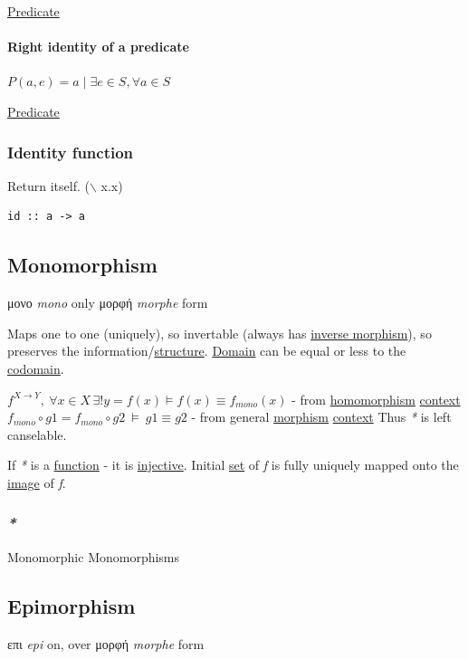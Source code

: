 \documentclass[a4paper,14pt,oneside]{book}
\begin{document}
\hyperref[org5e1d718]{Predicate}

\paragraph{\label{org3cef7e5}Right identity of a predicate}
\label{sec:orgc68b264}
\(P(a,e)=a \; | \; \exists e \in S, \forall a \in S\)

\hyperref[org5e1d718]{Predicate}

\subsubsection{\label{orgc58744b}Identity function}
\label{sec:org6354906}
Return itself.
($\backslash$ x.x)
\begin{verbatim}
id :: a -> a
\end{verbatim}

\subsection{\label{org51ecaf8}Monomorphism}
\label{sec:org0201534}
μονο \emph{mono} only
μορφή \emph{morphe} form

Maps one to one (uniquely), so invertable (always has \hyperref[org309a0d7]{inverse morphism}), so preserves the information/\hyperref[org2f3ef45]{structure}.
\hyperref[orgd3b5c7f]{Domain} can be equal or less to the \hyperref[org5ec3963]{codomain}.

\(f^{X \to Y}, \ \forall x \in X \, \exists! y=f(x) \vDash f(x) \equiv f_{mono}(x)\) - from \hyperref[org037eca6]{homomorphism} \hyperref[org93ac18e]{context}
\(f_{mono} \circ g1 = f_{mono} \circ g2 \ \vDash \ g1 \equiv g2\) - from general \hyperref[org60b7530]{morphism} \hyperref[org93ac18e]{context}
Thus \emph{*} is left canselable.

If \emph{*} is a \hyperref[org679af45]{function} - it is \hyperref[org12a8c28]{injective}. Initial \hyperref[org128a409]{set} of \emph{f} is fully uniquely mapped onto the \hyperref[orgcf22927]{image} of \emph{f}.

\subsubsection{\emph{*}}
\label{sec:orgcd88477}

\label{orgbc84e81}Monomorphic
\label{orgc231633}Monomorphisms

\subsection{\label{org28b86ab}Epimorphism}
\label{sec:org0a48aab}
επι \emph{epi} on, over
μορφή \emph{morphe} form
\end{document}
